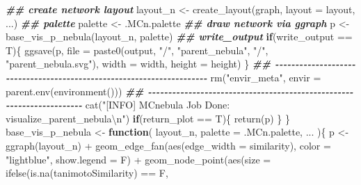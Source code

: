 \documentclass[
]{article}
\newenvironment{Shaded}{\begin{snugshade}}{\end{snugshade}}
\newcommand{\AttributeTok}[1]{\textcolor[rgb]{0.77,0.63,0.00}{#1}}
\newcommand{\ControlFlowTok}[1]{\textcolor[rgb]{0.13,0.29,0.53}{\textbf{#1}}}
\newcommand{\DocumentationTok}[1]{\textcolor[rgb]{0.56,0.35,0.01}{\textbf{\textit{#1}}}}
\newcommand{\FunctionTok}[1]{\textcolor[rgb]{0.00,0.00,0.00}{#1}}
\newcommand{\NormalTok}[1]{#1}
\newcommand{\OtherTok}[1]{\textcolor[rgb]{0.56,0.35,0.01}{#1}}
\newcommand{\SpecialCharTok}[1]{\textcolor[rgb]{0.00,0.00,0.00}{#1}}
\newcommand{\StringTok}[1]{\textcolor[rgb]{0.31,0.60,0.02}{#1}}
\begin{document}
\begin{Shaded}
\begin{Highlighting}[]
    \DocumentationTok{\#\# create network layout}
\NormalTok{    layout\_n }\OtherTok{\textless{}{-}} \FunctionTok{create\_layout}\NormalTok{(graph, }\AttributeTok{layout =}\NormalTok{ layout, ...)}
    \DocumentationTok{\#\# palette}
\NormalTok{    palette }\OtherTok{\textless{}{-}}\NormalTok{ .MCn.palette}
    \DocumentationTok{\#\# draw network via ggraph}
\NormalTok{    p }\OtherTok{\textless{}{-}} \FunctionTok{base\_vis\_p\_nebula}\NormalTok{(layout\_n, palette)}
    \DocumentationTok{\#\# write\_output}
    \ControlFlowTok{if}\NormalTok{(write\_output }\SpecialCharTok{==}\NormalTok{ T)\{}
      \FunctionTok{ggsave}\NormalTok{(p, }\AttributeTok{file =} \FunctionTok{paste0}\NormalTok{(output, }\StringTok{"/"}\NormalTok{, }\StringTok{"parent\_nebula"}\NormalTok{, }\StringTok{"/"}\NormalTok{, }\StringTok{"parent\_nebula.svg"}\NormalTok{),}
             \AttributeTok{width =}\NormalTok{ width, }\AttributeTok{height =}\NormalTok{ height)}
\NormalTok{    \}}
    \DocumentationTok{\#\# {-}{-}{-}{-}{-}{-}{-}{-}{-}{-}{-}{-}{-}{-}{-}{-}{-}{-}{-}{-}{-}{-}{-}{-}{-}{-}{-}{-}{-}{-}{-}{-}{-}{-}{-}{-}{-}{-}{-}{-}{-}{-}{-}{-}{-}{-}{-}{-}{-}{-}{-}{-}{-}{-}{-}{-}{-}{-}{-}{-}{-}{-}{-}{-}{-}{-}{-}{-}{-}{-} }
    \FunctionTok{rm}\NormalTok{(}\StringTok{"envir\_meta"}\NormalTok{, }\AttributeTok{envir =} \FunctionTok{parent.env}\NormalTok{(}\FunctionTok{environment}\NormalTok{()))}
    \DocumentationTok{\#\# {-}{-}{-}{-}{-}{-}{-}{-}{-}{-}{-}{-}{-}{-}{-}{-}{-}{-}{-}{-}{-}{-}{-}{-}{-}{-}{-}{-}{-}{-}{-}{-}{-}{-}{-}{-}{-}{-}{-}{-}{-}{-}{-}{-}{-}{-}{-}{-}{-}{-}{-}{-}{-}{-}{-}{-}{-}{-}{-}{-}{-}{-}{-}{-}{-}{-}{-}{-}{-}{-} }
    \FunctionTok{cat}\NormalTok{(}\StringTok{"[INFO] MCnebula Job Done: visualize\_parent\_nebula}\SpecialCharTok{\textbackslash{}n}\StringTok{"}\NormalTok{)}
    \ControlFlowTok{if}\NormalTok{(return\_plot }\SpecialCharTok{==}\NormalTok{ T)\{}
      \FunctionTok{return}\NormalTok{(p)}
\NormalTok{    \}}
\NormalTok{  \}}
\NormalTok{base\_vis\_p\_nebula }\OtherTok{\textless{}{-}}
  \ControlFlowTok{function}\NormalTok{(}
\NormalTok{           layout\_n,}
           \AttributeTok{palette =}\NormalTok{ .MCn.palette,}
\NormalTok{           ...}
\NormalTok{           )\{}
\NormalTok{    p }\OtherTok{\textless{}{-}} \FunctionTok{ggraph}\NormalTok{(layout\_n) }\SpecialCharTok{+} 
      \FunctionTok{geom\_edge\_fan}\NormalTok{(}\FunctionTok{aes}\NormalTok{(}\AttributeTok{edge\_width =}\NormalTok{ similarity),}
                    \AttributeTok{color =} \StringTok{"lightblue"}\NormalTok{, }\AttributeTok{show.legend =}\NormalTok{ F) }\SpecialCharTok{+} 
      \FunctionTok{geom\_node\_point}\NormalTok{(}\FunctionTok{aes}\NormalTok{(}\AttributeTok{size =} \FunctionTok{ifelse}\NormalTok{(}\FunctionTok{is.na}\NormalTok{(tanimotoSimilarity) }\SpecialCharTok{==}\NormalTok{ F,}

\end{Highlighting}
\end{Shaded}
\end{document}
